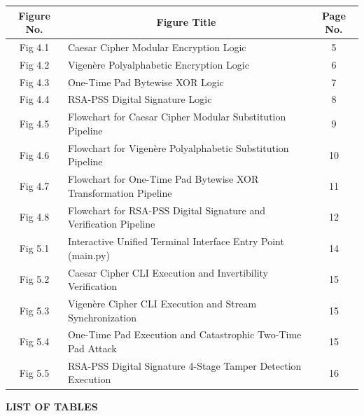 \documentclass[12pt,a4paper]{report}
\renewcommand{\texttt}[1]{{\normalfont #1}}
\begin{document}
\begin{table}[h!]
\centering
\fontsize{9.5}{12}\selectfont
\begin{tabular}{|c|p{4.8in}|c|}
\hline
\rowcolor{tableheader}
\textbf{Figure No.} & \multicolumn{1}{c|}{\textbf{Figure Title}} & \textbf{Page No.} \\
\hline
Fig 4.1 & Caesar Cipher Modular Encryption Logic & 5 \\
\hline
Fig 4.2 & Vigen\`ere Polyalphabetic Encryption Logic & 6 \\
\hline
Fig 4.3 & One-Time Pad Bytewise XOR Logic & 7 \\
\hline
Fig 4.4 & RSA-PSS Digital Signature Logic & 8 \\
\hline
Fig 4.5 & Flowchart for Caesar Cipher Modular Substitution Pipeline & 9 \\
\hline
Fig 4.6 & Flowchart for Vigen\`ere Polyalphabetic Substitution Pipeline & 10 \\
\hline
Fig 4.7 & Flowchart for One-Time Pad Bytewise XOR Transformation Pipeline & 11 \\
\hline
Fig 4.8 & Flowchart for RSA-PSS Digital Signature and Verification Pipeline & 12 \\
\hline
Fig 5.1 & Interactive Unified Terminal Interface Entry Point (\texttt{main.py}) & 14 \\
\hline
Fig 5.2 & Caesar Cipher CLI Execution and Invertibility Verification & 15 \\
\hline
Fig 5.3 & Vigen\`ere Cipher CLI Execution and Stream Synchronization & 15 \\
\hline
Fig 5.4 & One-Time Pad Execution and Catastrophic Two-Time Pad Attack & 15 \\
\hline
Fig 5.5 & RSA-PSS Digital Signature 4-Stage Tamper Detection Execution & 16 \\
\hline
\end{tabular}
\end{table}

\vspace{1.5em}

\begin{center}
    {\fontsize{14}{16}\bfseries LIST OF TABLES}\\[1.5em]
\end{center}
\end{document}
